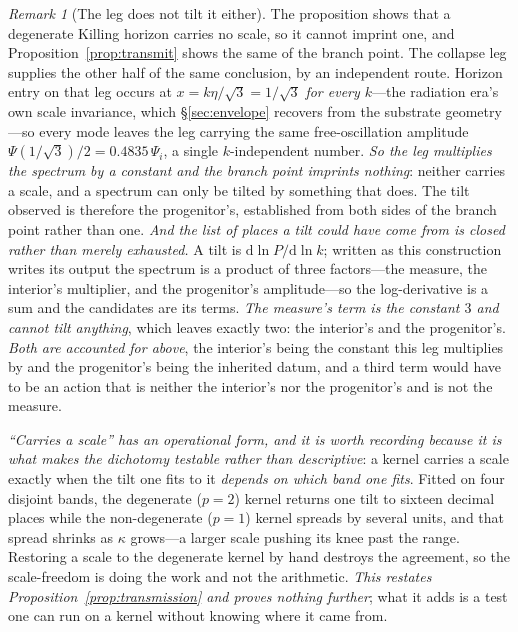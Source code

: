 \documentclass[11pt,a4paper]{article}
\theoremstyle{plain}
\theoremstyle{definition}
\theoremstyle{remark}
\newtheorem{remark}{Remark}
\newcommand{\dd}{\mathrm{d}}   %
\begin{document}
\begin{remark}[The leg does not tilt it either]\label{rem:transmission-leg}
The proposition shows that a degenerate Killing horizon carries no scale, so it cannot imprint one, and Proposition~\ref{prop:transmit} shows the same of the branch point. The
collapse leg supplies the other half of the same conclusion, by an independent route. Horizon entry on that leg
occurs at $x=k\eta/\sqrt3=1/\sqrt3$ \emph{for every $k$}---the radiation era's own scale invariance, which
\S\ref{sec:envelope} recovers from the substrate geometry---so every mode leaves the leg carrying the same
free-oscillation amplitude $\Psi(1/\sqrt3)/2=0.4835\,\Psi_i$, a single $k$-independent
number. \emph{So the leg multiplies the spectrum by a constant and the branch point
imprints nothing}: neither carries a scale, and a spectrum can only be tilted by something that does. The tilt
observed is therefore the progenitor's, established from both sides of the branch point rather than one.
\emph{And the list of places a tilt could have come from is closed rather than merely exhausted.} A tilt is
$\dd\ln P/\dd\ln k$; written as this construction writes its output the spectrum is a product of three
factors---the measure, the interior's multiplier, and the progenitor's amplitude---so the log-derivative is a
sum and the candidates are its terms. \emph{The measure's term is the constant $3$ and cannot tilt anything},
which leaves exactly two: the interior's and the progenitor's. \emph{Both are accounted for above}, the
interior's being the constant this leg multiplies by and the progenitor's being the inherited datum, and a third
term would have to be an action that is neither the interior's nor the progenitor's and is not the
measure.

\emph{``Carries a scale'' has an operational form, and it is worth recording because it
is what makes the dichotomy testable rather than descriptive}: a kernel carries a scale exactly when
the tilt one fits to it \emph{depends on which band one fits}. Fitted on four disjoint bands, the
degenerate ($p=2$) kernel returns one tilt to sixteen decimal places while the non-degenerate ($p=1$)
kernel spreads by several units, and that spread shrinks as $\kappa$ grows---a larger scale pushing
its knee past the range. Restoring a scale to the degenerate kernel by hand destroys the agreement, so
the scale-freedom is doing the work and not the
arithmetic.
\emph{This restates Proposition~\ref{prop:transmission} and proves nothing further}; what it adds is
a test one can run on a kernel without knowing where it came from.
\end{remark}
\end{document}
